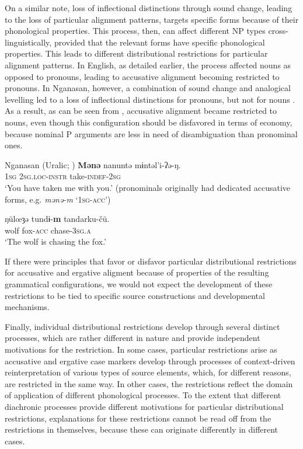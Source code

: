 \documentclass[output=paper]{langsci/langscibook}
\begin{document}
\z

On a similar note, loss of inflectional distinctions through sound
change,
leading to the loss of particular alignment patterns, targets specific
forms because of their phonological properties. This process, then, can affect different NP types cross-linguistically,
provided that the relevant forms have specific phonological
properties. This leads to different distributional
restrictions for particular alignment patterns. In English, as
detailed earlier, the process affected nouns as
opposed to pronouns, leading to accusative alignment becoming
restricted to pronouns. In  Nganasan, however, a combination of sound change and
analogical levelling led to a  loss of inflectional
distinctions for pronouns, but not for nouns
. As a result, as can be seen from
, accusative alignment became
restricted to nouns, even though this configuration should be
disfavored in terms of economy, because nominal P arguments are less in need
of disambiguation than pronominal ones.

\ea\label{nganasan}
Nganasan (Uralic; )
  \ea
    \gll \textbf{{Mənə}} nanuntə m​ɨntəl'i-ʔə-ŋ.\\
    1\textsc{sg} 2\textsc{sg.loc-instr} take-\textsc{indef}-2\textsc{sg}\\
    \glt `You have taken me with you.' (pronominals originally had dedicated accusative forms, e.g. {\em mənə-m} `1\textsc{sg-acc}')
    
  \ex
    \gll ŋül{\oe}ȝə tund​ɨ-\textbf{{m}} tandarku-čü.\\
    wolf fox-\textsc{acc} chase-3\textsc{sg.a}\\
    \glt `The wolf is chasing the fox.'
    
  \z
\z

If there were principles that favor or disfavor particular distributional
restrictions for accusative and ergative aligment because of properties of the
resulting grammatical configurations, we would not expect the development of
these restrictions to be tied to specific source
constructions and developmental mechanisms. 

Finally, individual distributional restrictions develop through several distinct
processes, which are rather different in nature and provide
independent motivations for the restriction. In some cases, particular
restrictions arise as accusative and ergative case markers develop
through processes of context-driven reinterpretation of various types
of source elements, which, for different reasons, are restricted in the same way. In other cases, the restrictions reflect the domain of
application of different phonological processes. To the extent that different diachronic processes provide different
motivations for particular distributional restrictions, 
explanations for these restrictions cannot be read off from the
restrictions in themselves, because these can originate differently in
different cases.
\end{document}
